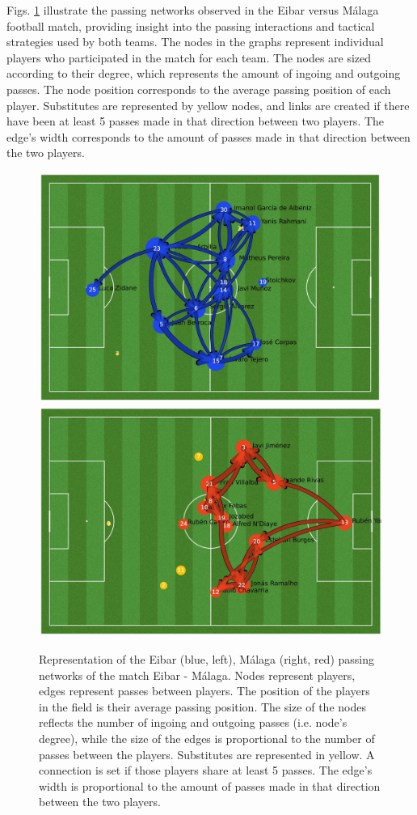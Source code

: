 \documentclass[
  twoside,nohyper]{book}
\begin{document}
Figs. \ref{fig:homepass} illustrate the
passing networks observed in the Eibar versus Málaga football match,
providing insight into the passing interactions and tactical strategies
used by both teams. The nodes in the graphs represent individual players
who participated in the match for each team. The nodes are sized
according to their degree, which represents the amount of ingoing and
outgoing passes. The node position corresponds to the average passing
position of each player. Substitutes are represented by yellow nodes,
and links are created if there have been at least 5 passes made in that
direction between two players. The edge's width corresponds to the
amount of passes made in that direction between the two players.

\begin{figure}[H]

{\centering \includegraphics[width=0.5\linewidth,]{imagenes/home_pass_network} \includegraphics[width=0.5\linewidth,]{imagenes/away_pass_network} 

}

\caption{Representation of the Eibar (blue, left), Málaga (right, red) passing networks of the match Eibar - Málaga. Nodes represent players, edges represent passes between players. The position of the players in the field is their average passing position. The size of the nodes reflects the number of ingoing and outgoing passes (i.e. node’s degree), while the size of the edges is proportional to the number of passes between the players. Substitutes are represented in yellow. A connection is set if those players share at least 5 passes. The edge’s width is proportional to the amount of passes made in that direction between the two players.}\label{fig:homepass}
\end{figure}
\end{document}
